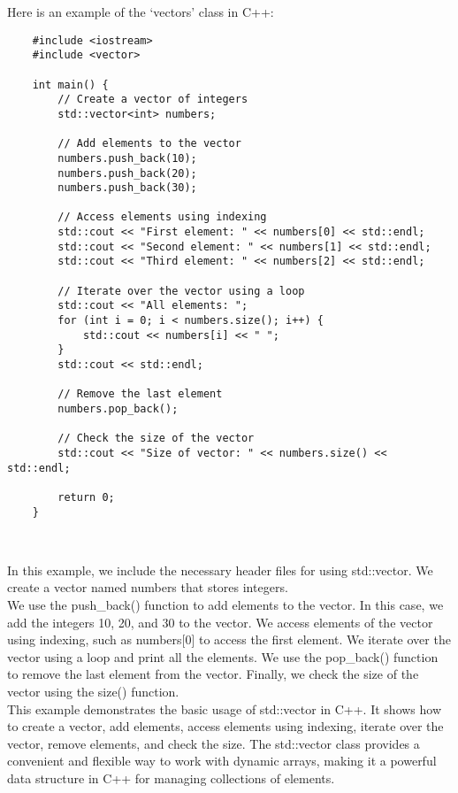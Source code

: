 \begin{solution}
    Here is an example of the `vectors' class in C++: \\
    \horizontalline
    \begin{verbatim}
    #include <iostream>
    #include <vector>
    
    int main() {
        // Create a vector of integers
        std::vector<int> numbers;
    
        // Add elements to the vector
        numbers.push_back(10);
        numbers.push_back(20);
        numbers.push_back(30);
    
        // Access elements using indexing
        std::cout << "First element: " << numbers[0] << std::endl;
        std::cout << "Second element: " << numbers[1] << std::endl;
        std::cout << "Third element: " << numbers[2] << std::endl;
    
        // Iterate over the vector using a loop
        std::cout << "All elements: ";
        for (int i = 0; i < numbers.size(); i++) {
            std::cout << numbers[i] << " ";
        }
        std::cout << std::endl;
    
        // Remove the last element
        numbers.pop_back();
    
        // Check the size of the vector
        std::cout << "Size of vector: " << numbers.size() << std::endl;
    
        return 0;
    }        
    \end{verbatim} \\
    \horizontalline

    In this example, we include the necessary header files for using std::vector. We create a vector named numbers that stores integers. \\

    \noindent We use the push\_back() function to add elements to the vector. In this case, we add the integers 10, 20, and 30 to the vector. We access elements of the vector using indexing, such as numbers[0] to access the first element. We iterate 
    over the vector using a loop and print all the elements. We use the pop\_back() function to remove the last element from the vector. Finally, we check the size of the vector using the size() function. \\

    \noindent This example demonstrates the basic usage of std::vector in C++. It shows how to create a vector, add elements, access elements using indexing, iterate over the vector, remove elements, and check the size. The std::vector class 
    provides a convenient and flexible way to work with dynamic arrays, making it a powerful data structure in C++ for managing collections of elements. \\
\end{solution}

